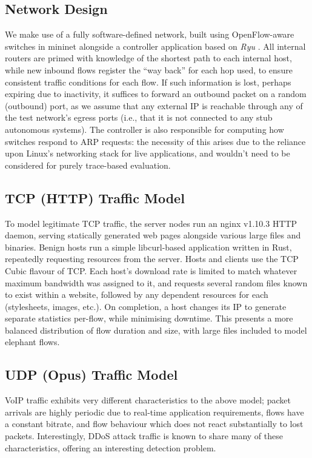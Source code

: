 \documentclass[10pt, times, comsoc]{IEEEtran}
\begin{document}
\subsection{Network Design}
We make use of a fully software-defined network, built using OpenFlow-aware switches in mininet alongside a controller application based on \emph{Ryu} \cite{ryu}.
All internal routers are primed with knowledge of the shortest path to each internal host, while new inbound flows register the ``way back'' for each hop used, to ensure consistent traffic conditions for each flow.
If such information is lost, perhaps expiring due to inactivity, it suffices to forward an outbound packet on a random (outbound) port, as we assume that any external IP is reachable through any of the test network's egress ports (i.e., that it is not connected to any stub autonomous systems).
The controller is also responsible for computing how switches respond to ARP requests: the necessity of this arises due to the reliance upon Linux's networking stack for live applications, and wouldn't need to be considered for purely trace-based evaluation.

\subsection{TCP (HTTP) Traffic Model}
To model legitimate TCP traffic, the server nodes run an nginx v1.10.3 HTTP daemon, serving statically generated web pages alongside various large files and binaries.
Benign hosts run a simple libcurl-based application written in Rust, repeatedly requesting resources from the server.
Hosts and clients use the TCP Cubic \cite{rfc8312} flavour of TCP.
Each host's download rate is limited to match whatever maximum bandwidth was assigned to it, and requests several random files known to exist within a website, followed by any dependent resources for each (stylesheets, images, etc.).
On completion, a host changes its IP to generate separate statistics per-flow, while minimising downtime.
This presents a more balanced distribution of flow duration and size, with large files included to model elephant flows.

\subsection{UDP (Opus) Traffic Model}
VoIP traffic exhibits very different characteristics to the above model; packet arrivals are highly periodic due to real-time application requirements, flows have a constant bitrate, and flow behaviour which does not react substantially to lost packets.
Interestingly, DDoS attack traffic is known to share many of these characteristics, offering an interesting detection problem.
\end{document}
